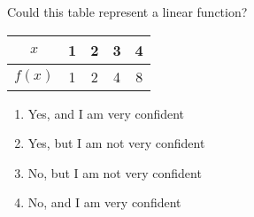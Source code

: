\bigskip

\item Could this table represent a linear function?

\begin{tabular}{|c|c|c|c|c|}
\hline
$x$ & 1 & 2 & 3 & 4 \\
\hline
$f(x)$ & 1 & 2 & 4 & 8 \\
\hline
\end{tabular}

\begin{enumerate}
\item Yes, and I am very confident  
\item Yes, but I am not very confident
\item No, but I am not very confident
\item No, and I am very confident  
\end{enumerate}

